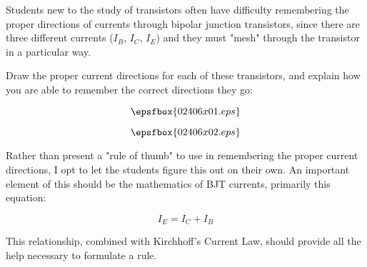 

Students new to the study of transistors often have difficulty remembering the proper directions of currents through bipolar junction transistors, since there are three different currents ($I_B$, $I_C$, $I_E$) and they must "mesh" through the transistor in a particular way.

Draw the proper current directions for each of these transistors, and explain how you are able to remember the correct directions they go:

$$\epsfbox{02406x01.eps}$$







$$\epsfbox{02406x02.eps}$$







Rather than present a "rule of thumb" to use in remembering the proper current directions, I opt to let the students figure this out on their own.  An important element of this should be the mathematics of BJT currents, primarily this equation:

$$I_E = I_C + I_B$$

This relationship, combined with Kirchhoff's Current Law, should provide all the help necessary to formulate a rule.




